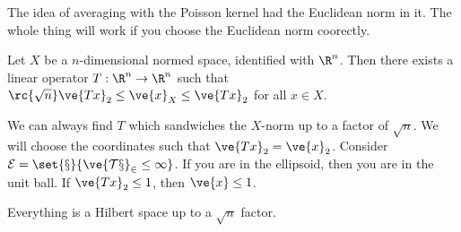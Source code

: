 The idea of averaging with the Poisson kernel had the Euclidean norm in it. The whole thing will work if you choose the Euclidean norm coorectly. %

\begin{thm}
Let $X$ be a $n$-dimensional normed space, identified with $\R^n$. Then there exists a linear operator $T:\R^n\to \R^n$ such that $\rc{\sqrt{n}}\ve{Tx}_2\le \ve{x}_X \le \ve{Tx}_2$ for all $x\in X$.
\end{thm}
We can always find $T$ which sandwiches the $X$-norm up to a factor of $\sqrt n$. We will choose  the coordinates such that $\ve{Tx}_2=\ve{x}_2$. %
Consider $\cal E=\set{x}{\ve{Tx}_2\le 1}$. If you are in the ellipsoid, then you are in the unit ball. If $\ve{Tx}_2\le 1$, then $\ve{x}\le 1$. 

Everything is a Hilbert space up to a $\sqrt n$ factor.

